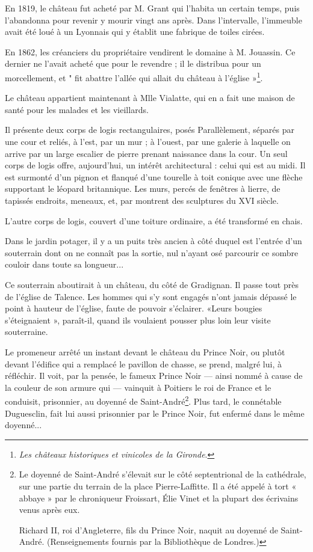 En 1819, le château fut acheté par M. Grant qui l'habita un certain temps, puis l'abandonna pour revenir y mourir vingt ans après. Dans l'intervalle, l'immeuble avait été loué à un Lyonnais qui y établit une fabrique de toiles cirées.

En 1862, les créanciers du propriétaire vendirent le domaine à M. Jouassin. Ce dernier ne l'avait acheté que pour le revendre ; il le distribua pour un morcellement, et " fit abattre l'allée qui allait du château à l'église »\footnote{\textit{Les châteaux historiques et vinicoles de la Gironde}.}.

Le château appartient maintenant à Mlle Vialatte, qui en a fait une maison de santé pour les malades et les vieillards.

Il présente deux corps de logis rectangulaires, posés Parallèlement, séparés par une cour et reliés, à l'est, par un mur ; à l'ouest, par une galerie à laquelle on arrive par un large escalier de pierre prenant naissance dans la cour. Un seul corps de logis offre, aujourd'hui, un intérêt architectural : celui qui est au midi. Il est surmonté d'un pignon et flanqué d'une tourelle à toit conique avec une flèche supportant le léopard britannique. Les murs, percés de fenêtres à lierre, de tapissés endroits, meneaux, et, par montrent des sculptures du XVI\ieme{} siècle.

L'autre corps de logis, couvert d'une toiture ordinaire, a été transformé en chais.

Dans le jardin potager, il y a un puits très ancien à côté duquel est l'entrée d'un souterrain dont on ne connaît pas la sortie, nul n'ayant osé parcourir ce sombre couloir dans toute sa longueur...

Ce souterrain aboutirait à un château, du côté de Gradignan. Il passe tout près de l'église de Talence. Les hommes qui s'y sont engagés n'ont jamais dépassé le point à hauteur de l'église, faute de pouvoir s'éclairer. «Leurs bougies s'éteignaient », paraît-il, quand ils voulaient pousser plus loin leur visite souterraine.

Le promeneur arrêté un instant devant le château du Prince Noir, ou plutôt devant l'édifice qui a remplacé le pavillon de chasse, se prend, malgré lui, à réfléchir. Il voit, par la pensée, le fameux Prince Noir — ainsi nommé à cause de la couleur de son armure qui — vainquit à Poitiers le roi de France et le conduisit, prisonnier, au doyenné de Saint-André\footnote{Le doyenné de Saint-André s'élevait sur le côté septentrional de la cathédrale, sur une partie du terrain de la place Pierre-Laffitte. Il a été appelé à tort « abbaye » par le chroniqueur Froissart, Élie Vinet et la plupart des écrivains venus après eux.
	
	Richard II, roi d'Angleterre, fils du Prince Noir, naquit au doyenné de Saint-André. (Renseignements fournis par la Bibliothèque de Londres.)}. Plus tard, le connétable Duguesclin, fait lui aussi prisonnier par le Prince Noir, fut enfermé dans le même doyenné...

